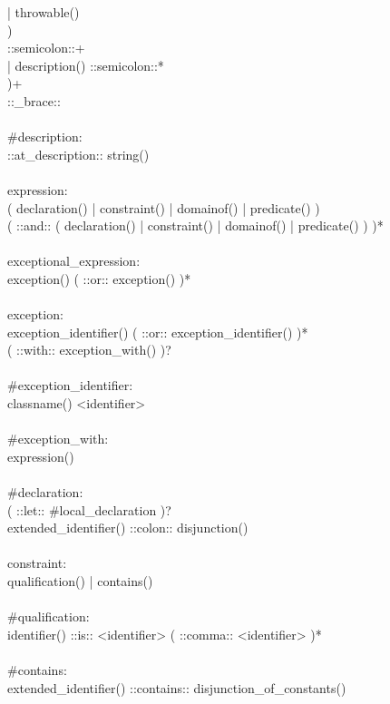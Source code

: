 \begin{bigbigpre}
          | throwable() \\
        ) \\
        ::semicolon::+ \\
      | description() ::semicolon::* \\
    )+ \\
    ::_brace:: \\
 \\
#description: \\
    ::at_description:: string() \\
 \\
expression: \\
              ( declaration() | constraint() | domainof() | predicate() ) \\
    ( ::and:: ( declaration() | constraint() | domainof() | predicate() ) )* \\
 \\
exceptional_expression: \\
    exception() ( ::or:: exception() )* \\
 \\
exception: \\
    exception_identifier() ( ::or:: exception_identifier() )* \\
    ( ::with:: exception_with() )? \\
 \\
#exception_identifier: \\
    classname() <identifier> \\
 \\
#exception_with: \\
    expression() \\
 \\
#declaration: \\
    ( ::let:: #local_declaration )? \\
    extended_identifier() ::colon:: disjunction() \\
 \\
constraint: \\
    qualification() | contains() \\
 \\
#qualification: \\
    identifier() ::is:: <identifier> ( ::comma:: <identifier> )* \\
 \\
#contains: \\
    extended_identifier() ::contains:: disjunction_of_constants() \\
 \\

\end{bigbigpre}

